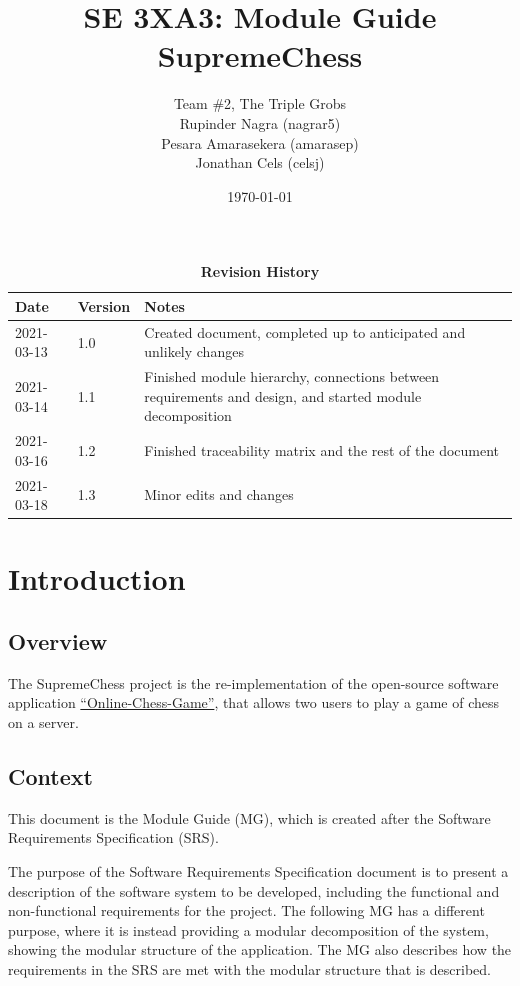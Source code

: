\documentclass[12pt, titlepage]{article}
\title{SE 3XA3: Module Guide\\SupremeChess}
\author{Team \#2, The Triple Grobs
		\\ Rupinder Nagra (nagrar5)
		\\ Pesara Amarasekera (amarasep)
		\\ Jonathan Cels (celsj)
}
\date{\today}
\begin{document}
\maketitle

\tableofcontents
\listoftables
\listoffigures

\begin{table}[bp]
\caption{\bf Revision History}
\begin{tabularx}{\textwidth}{p{3cm}p{2cm}X}
\toprule {\bf Date} & {\bf Version} & {\bf Notes}\\
\midrule
2021-03-13 & 1.0 & Created document, completed up to anticipated and unlikely changes\\
2021-03-14 & 1.1 & Finished module hierarchy, connections between requirements and design, and started module decomposition\\
2021-03-16 & 1.2 & Finished traceability matrix and the rest of the document\\
2021-03-18 & 1.3 & Minor edits and changes\\
\bottomrule
\end{tabularx}
\end{table}

\newpage


\section{Introduction}

\subsection{Overview}

The SupremeChess project is the re-implementation of the open-source software application \href{https://github.com/techwithtim/Online-Chess-Game}{``Online-Chess-Game''}, that allows two users to play a game of chess on a server.

\subsection{Context}

This document is the Module Guide (MG), which is created after the Software Requirements Specification (SRS). 

The purpose of the Software Requirements Specification document is to present a description of the software system to be developed, including the functional and non-functional requirements for the project. The following MG has a different purpose, where it is instead providing a modular decomposition of the system, showing the modular structure of the application. The MG also describes how the requirements in the SRS are met with the modular structure that is described.
\end{document}
